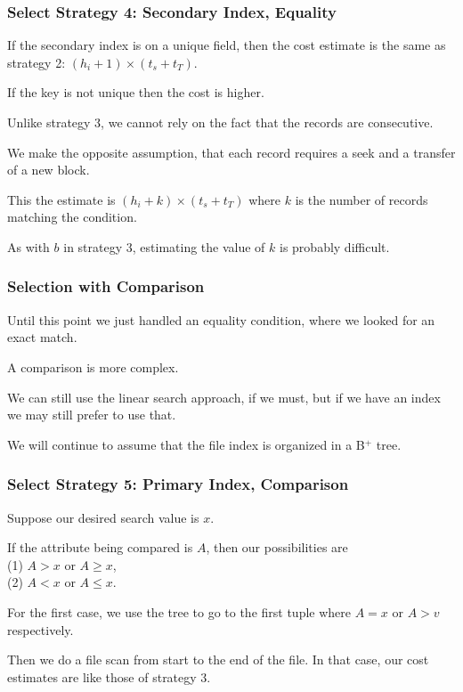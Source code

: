 \begin{frame}
\frametitle{Select Strategy 4: Secondary Index, Equality}
If the secondary index is on a unique field, then the cost estimate is the same as strategy 2:  $(h_{i} + 1) \times (t_{s} + t_{T})$.

If the key is not unique then the cost is higher. 

Unlike strategy 3, we cannot rely on the fact that the records are consecutive.

We make the opposite assumption, that each record requires a seek and a transfer of a new block. 

This the estimate is $(h_{i} + k) \times (t_{s} + t_{T})$ where $k$ is the number of records matching the condition.

As with $b$ in strategy 3, estimating the value of $k$ is probably difficult.


\end{frame}



\begin{frame}
\frametitle{Selection with Comparison}

Until this point we just handled an equality condition, where we looked for an exact match. 

A comparison is more complex. 

We can still use the linear search approach, if we must, but if we have an index we may still prefer to use that. 

We will continue to assume that the file index is organized in a B$^{+}$ tree.

\end{frame}

\begin{frame}
\frametitle{Select Strategy 5: Primary Index, Comparison}

Suppose our desired search value is $x$. 

If the attribute being compared is $A$, then our possibilities are\\
\quad (1) $A > x$ or $A \geq x$,\\
\quad (2) $A < x$ or $A \leq x$.

For the first case, we use the tree to go to the first tuple where $A = x$ or $A > v$ respectively. 

Then we do a file scan from start to the end of the file. In that case, our cost estimates are like those of strategy 3.
\end{frame}

